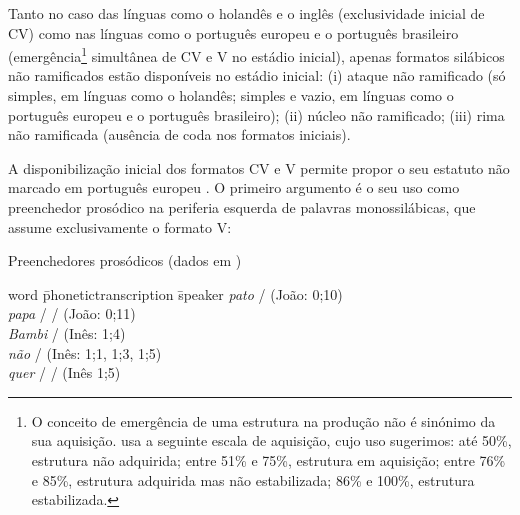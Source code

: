 \documentclass[output=paper]{LSP/langsci}
\begin{document}
Tanto no caso das línguas como o holandês e o inglês (exclusividade inicial de CV) como nas línguas como o português europeu e o português brasileiro (emergência\footnote{O conceito de emergência de uma estrutura na produção não é sinónimo da sua aquisição. \citet{matzenauer1990} usa a seguinte escala de aquisição, cujo uso sugerimos: até 50\%, estrutura não adquirida; entre 51\% e 75\%, estrutura em aquisição; entre 76\% e 85\%, estrutura adquirida mas não estabilizada; 86\% e 100\%, estrutura estabilizada.} simultânea de CV e V no estádio inicial), apenas formatos silábicos não ramificados estão disponíveis no estádio inicial: (i) ataque não ramificado (só simples, em línguas como o holandês; simples e vazio, em línguas como o português europeu e o português brasileiro); (ii) núcleo não ramificado; (iii) rima não ramificada (ausência de coda nos formatos iniciais).

A disponibilização inicial dos formatos CV e V permite propor o seu estatuto não marcado em português europeu \citep{costafreitas1999}. O primeiro argumento é o seu uso como preenchedor prosódico na periferia esquerda de palavras monossilábicas, que assume exclusivamente o formato V:

\ea\label{ex:freitas_preenchedores}
Preenchedores prosódicos (dados em \citealt{freitas1997})\\
\begin{tabbing}
  word \quad \= phonetictranscription \enskip \= speaker \kill
  \textit{pato} \> \textipa{[\textprimstress p5]} / \textipa{[5\textprimstress p5]} \> (João: 0;10)\\
    \textit{papa} \> \textipa{[\textprimstress pa]} / \textipa{[5\textprimstress p5]} / \textipa{[1\textprimstress p5]} \> (João: 0;11)\\
      \textit{Bambi} \> \textipa{[\textprimstress b5]} / \textipa{[5\textprimstress b5]} \> (Inês: 1;4)\\
        \textit{não} \> \textipa{[\textprimstress n5]} / \textipa{[5\textprimstress n5]} \> (Inês: 1;1, 1;3, 1;5)\\
  \textit{quer} \> \textipa{[\textprimstress kE]} / \textipa{[5\textprimstress kE]} / \textipa{[5\textprimstress kE]} \> (Inês 1;5)
  \end{tabbing}
\z
\end{document}
